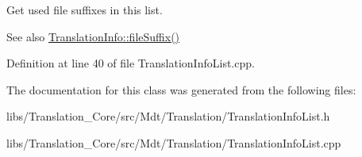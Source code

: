 Get used file suffixes in this list. 

\begin{DoxySeeAlso}{See also}
\hyperlink{class_mdt_1_1_translation_1_1_translation_info_a08e38cca61e807944db66457413e731b}{Translation\+Info\+::file\+Suffix()} 
\end{DoxySeeAlso}


Definition at line 40 of file Translation\+Info\+List.\+cpp.



The documentation for this class was generated from the following files\+:\begin{DoxyCompactItemize}
\item 
libs/\+Translation\+\_\+\+Core/src/\+Mdt/\+Translation/Translation\+Info\+List.\+h\item 
libs/\+Translation\+\_\+\+Core/src/\+Mdt/\+Translation/Translation\+Info\+List.\+cpp\end{DoxyCompactItemize}
